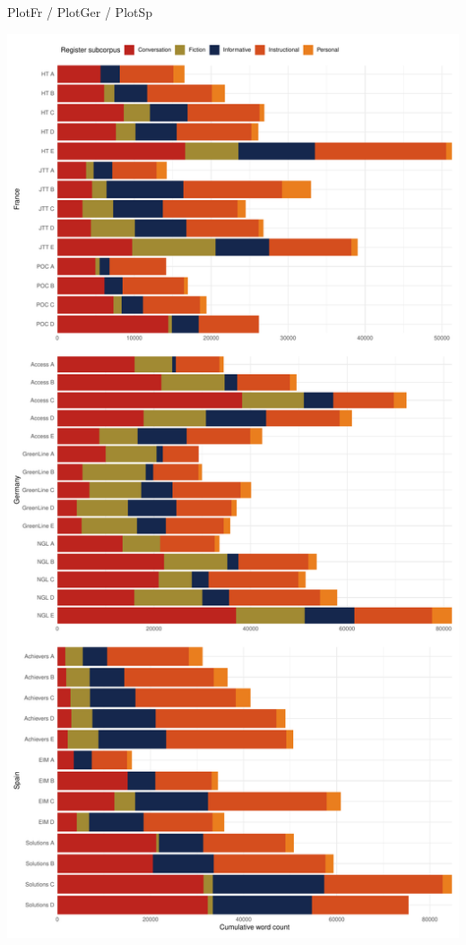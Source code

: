 \documentclass[
  letterpaper,
  DIV=11,
  numbers=noendperiod]{scrreprt}
\newenvironment{Shaded}{\begin{snugshade}}{\end{snugshade}}
\newcommand{\NormalTok}[1]{\textcolor[rgb]{0.00,0.23,0.31}{#1}}
\newcommand{\SpecialCharTok}[1]{\textcolor[rgb]{0.37,0.37,0.37}{#1}}
\begin{document}
\begin{Shaded}
\begin{Highlighting}[]
\NormalTok{PlotFr }\SpecialCharTok{/}
\NormalTok{PlotGer }\SpecialCharTok{/}
\NormalTok{PlotSp}
\end{Highlighting}
\end{Shaded}

\includegraphics{D_Ch6_DataPrep_files/figure-pdf/TEC-metadata-1.pdf}
\end{document}

